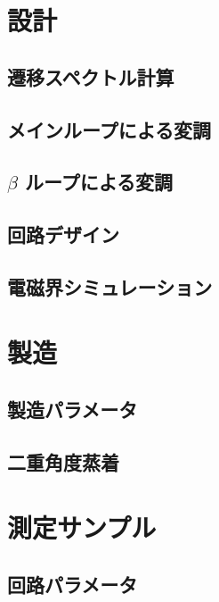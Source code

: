 \section{設計}

    \subsection{遷移スペクトル計算}
    \subsection{メインループによる変調}
    \subsection{$\beta$ ループによる変調}

    \subsection{回路デザイン}

    \subsection{電磁界シミュレーション}
    

\section{製造}

    \subsection{製造パラメータ}

    \subsection{二重角度蒸着}

\section{測定サンプル}

    \subsection{回路パラメータ}
